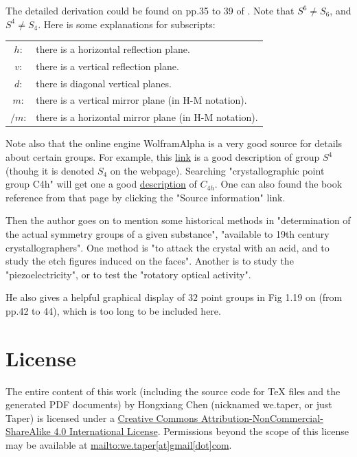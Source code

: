 \documentclass{article}
\begin{document}
    The detailed derivation could be found on pp.35 to 39 of
    \cite{Sternberg1994}. Note that $S^6\neq S_6$, and $S^4\neq S_4$. Here is
    some explanations for subscripts: 
    \begin{table}[H]
    \centering
    \begin{tabular}{c l}
        $h$: & there is a horizontal reflection plane. \\
        $v$: & there is a vertical reflection plane. \\
        $d$: & there is diagonal vertical planes. \\
        $m$: & there is a vertical mirror plane (in H-M notation). \\
        $/m$: & there is a horizontal mirror plane (in H-M notation).
    \end{tabular}
    \end{table}
    
    Note also that the online engine WolframAlpha is a very good source for
    details about certain groups. For example, this
    \href{http://m.wolframalpha.com/input/?i=crystallographic+point+group+C4h}{link}
    is a good description of group $S^4$ (thouhg it is denoted $S_4$ on the
    webpage). Searching "crystallographic point group C4h" will get one a good
    \href{http://m.wolframalpha.com/input/?i=crystallographic+point+group+C4h}{description}
    of $C_{4h}$. One can also found the book reference from that page by
    clicking the "Source information" link.

    Then the author goes on to mention some historical methods in "determination
    of the actual symmetry groups of a given substance", "available to 19th
    century crystallographers". One method is "to attack the crystal with an
    acid, and to study the etch figures induced on the faces".  Another is to
    study the "piezoelectricity", or to test the "rotatory optical activity".

    He also gives a helpful graphical display of $32$ point groups in Fig 1.19
    on \cite{Sternberg1994}(from pp.42 to 44), which is too long to be included
    here.



\printnomenclature
\section{License}
The entire content of this work (including the source code
for TeX files and the generated PDF documents) by 
Hongxiang Chen (nicknamed we.taper, or just Taper) is
licensed under a 
\href{http://creativecommons.org/licenses/by-nc-sa/4.0/}{Creative 
Commons Attribution-NonCommercial-ShareAlike 4.0 International 
License}. Permissions beyond the scope of this 
license may be available at \url{mailto:we.taper[at]gmail[dot]com}.
\end{document}
